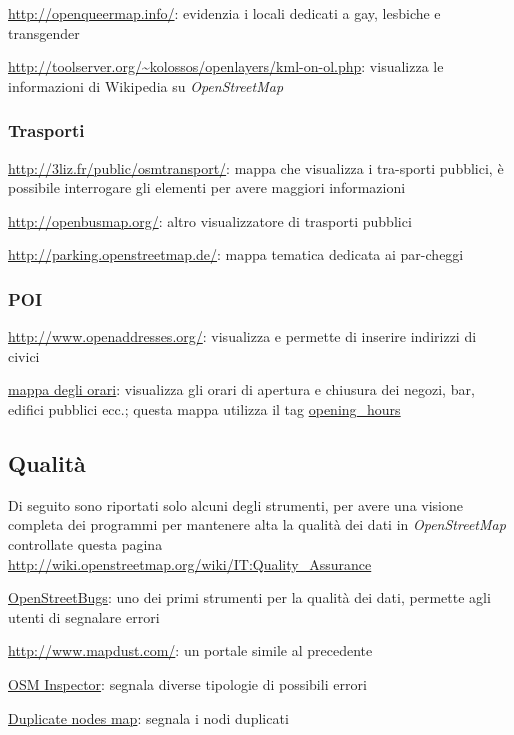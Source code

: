 \documentclass[a4paper,twoside,12pt,]{article}
\newcommand{\osm}{\emph{OpenStreetMap}\xspace}
\begin{document}
\url{http://openqueermap.info/}: evidenzia i locali dedicati a gay, lesbiche e transgender 

\url{http://toolserver.org/~kolossos/openlayers/kml-on-ol.php}: visualizza le informazioni di Wikipedia su \osm

\subsubsection{Trasporti}

\url{http://3liz.fr/public/osmtransport/}: mappa che visualizza i tra-sporti pubblici, è possibile interrogare gli elementi per avere maggiori informazioni

\url{http://openbusmap.org/}: altro visualizzatore di trasporti pubblici

\url{http://parking.openstreetmap.de/}: mappa tematica dedicata ai par-cheggi

\subsubsection{POI}

\url{http://www.openaddresses.org/}: visualizza e permette di inserire indirizzi di civici

\href{http://www.netzwolf.info/kartografie/osm/time_domain/map_opening}{mappa degli orari}: visualizza gli orari di apertura e chiusura dei negozi, bar, edifici pubblici ecc.; questa mappa utilizza il tag \href{http://wiki.openstreetmap.org/wiki/Opening_hours}{opening\_hours}

\subsection{Qualità}
Di seguito sono riportati solo alcuni degli strumenti, per avere una visione completa dei programmi per mantenere alta la qualità dei dati in \osm controllate questa pagina \url{http://wiki.openstreetmap.org/wiki/IT:Quality_Assurance}

\href{http://openstreetbugs.schokokeks.org/}{OpenStreetBugs}: uno dei primi strumenti per la qualità dei dati, permette agli utenti di segnalare errori

\url{http://www.mapdust.com/}: un portale simile al precedente

\href{http://tools.geofabrik.de/osmi/}{OSM Inspector}: segnala diverse tipologie di possibili errori

\href{http://matt.dev.openstreetmap.org/dupe_nodes/}{Duplicate nodes map}: segnala i nodi duplicati
\end{document}
